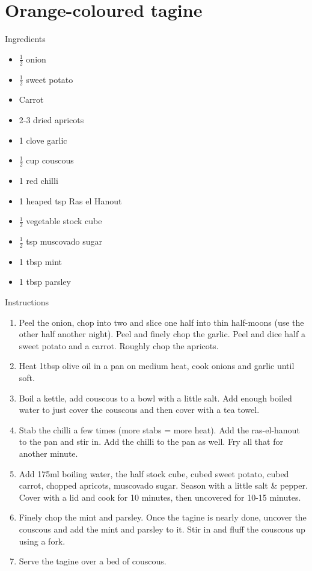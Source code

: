 \documentclass[../dinner.tex]{subfiles}
\begin{document}
	\pagestyle{fancy}
	\fancyhf{}
	\newpage
	\section{Orange-coloured tagine}
	\lhead{}
	{\Large Ingredients}
	\begin{multicols}{2}
		\begin{itemize}
			\item \(\frac{1}{2}\) onion
			\item \(\frac{1}{2}\) sweet potato
			\item Carrot
			\item 2-3 dried apricots
			\item 1 clove garlic
			\item \(\frac{1}{2}\) cup couscous
		\end{itemize}
		\columnbreak
		\begin{itemize}
			\item 1 red chilli
			\item 1 heaped tsp Ras el Hanout
			\item \(\frac{1}{2}\) vegetable stock cube
			\item \(\frac{1}{2}\) tsp muscovado sugar
			\item 1 tbsp mint
			\item 1 tbsp parsley
		\end{itemize}
	\end{multicols}

	{\Large Instructions}
	\begin{enumerate}
		\item Peel the onion, chop into two and slice one half into thin half-moons (use the other half another night). Peel and finely chop the garlic. Peel and dice half a sweet potato and a carrot. Roughly chop the apricots.
		\item Heat 1tbsp olive oil in a pan on medium heat, cook onions and garlic until soft.
		\item Boil a kettle, add couscous to a bowl with a little salt. Add enough boiled water to just cover the couscous and then cover with a tea towel.
		\item Stab the chilli a few times (more stabs = more heat). Add the ras-el-hanout to the pan and stir in. Add the chilli to the pan as well. Fry all that for another minute.
		\item Add 175ml boiling water, the half stock cube, cubed sweet potato, cubed carrot, chopped apricots, muscovado sugar. Season with a little salt \& pepper.\\
		Cover with a lid and cook for 10 minutes, then uncovered for 10-15 minutes.
		\item Finely chop the mint and parsley. Once the tagine is nearly done, uncover the couscous and add the mint and parsley to it. Stir in and fluff the couscous up using a fork.
		\item Serve the tagine over a bed of couscous.
	\end{enumerate}
\end{document}
